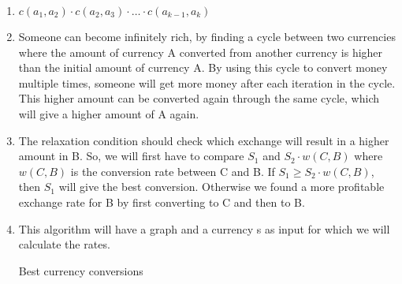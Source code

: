 \documentclass{article}
\begin{document}
\begin{enumerate}
    \item $c(a_1, a_2) \cdot c(a_2, a_3) \cdot \dots \cdot c(a_{k - 1}, a_k)$
    \item Someone can become infinitely rich, by finding a cycle between two currencies where the amount of currency A converted from another currency is higher than the initial amount of currency A. By using this cycle to convert money multiple times, someone will get more money after each iteration in the cycle. This higher amount can be converted again through the same cycle, which will give a higher amount of A again.
    \item The relaxation condition should check which exchange will result in a higher amount in B. So, we will first have to compare $S_1$ and $S_2 \cdot w(C, B)$ where $w(C, B)$ is the conversion rate between C and B. If $S_1 \geq S_2 \cdot w(C, B)$, then $S_1$ will give the best conversion. Otherwise we found a more profitable exchange rate for B by first converting to C and then to B.
    \item This algorithm will have a graph and a currency s as input for which we will calculate the rates.
    \begin{algorithm}[ht]
  \DontPrintSemicolon



    \caption{Best currency conversions}
\end{algorithm}
\end{enumerate}

\newpage
\end{document}
